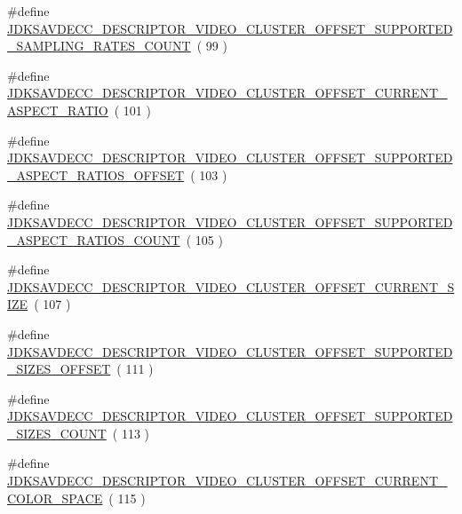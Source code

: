 \begin{DoxyCompactItemize}
\item 
\#define \hyperlink{group__descriptor__video__cluster_ga8cd45eb4da7e8460ffd3e04ffb6266a2}{J\+D\+K\+S\+A\+V\+D\+E\+C\+C\+\_\+\+D\+E\+S\+C\+R\+I\+P\+T\+O\+R\+\_\+\+V\+I\+D\+E\+O\+\_\+\+C\+L\+U\+S\+T\+E\+R\+\_\+\+O\+F\+F\+S\+E\+T\+\_\+\+S\+U\+P\+P\+O\+R\+T\+E\+D\+\_\+\+S\+A\+M\+P\+L\+I\+N\+G\+\_\+\+R\+A\+T\+E\+S\+\_\+\+C\+O\+U\+NT}~( 99 )
\item 
\#define \hyperlink{group__descriptor__video__cluster_gabffef4b51634347e0f912ad6b97ddb6a}{J\+D\+K\+S\+A\+V\+D\+E\+C\+C\+\_\+\+D\+E\+S\+C\+R\+I\+P\+T\+O\+R\+\_\+\+V\+I\+D\+E\+O\+\_\+\+C\+L\+U\+S\+T\+E\+R\+\_\+\+O\+F\+F\+S\+E\+T\+\_\+\+C\+U\+R\+R\+E\+N\+T\+\_\+\+A\+S\+P\+E\+C\+T\+\_\+\+R\+A\+T\+IO}~( 101 )
\item 
\#define \hyperlink{group__descriptor__video__cluster_ga5e964d79d640516ef264474d8079eb2f}{J\+D\+K\+S\+A\+V\+D\+E\+C\+C\+\_\+\+D\+E\+S\+C\+R\+I\+P\+T\+O\+R\+\_\+\+V\+I\+D\+E\+O\+\_\+\+C\+L\+U\+S\+T\+E\+R\+\_\+\+O\+F\+F\+S\+E\+T\+\_\+\+S\+U\+P\+P\+O\+R\+T\+E\+D\+\_\+\+A\+S\+P\+E\+C\+T\+\_\+\+R\+A\+T\+I\+O\+S\+\_\+\+O\+F\+F\+S\+ET}~( 103 )
\item 
\#define \hyperlink{group__descriptor__video__cluster_gaef518281ffcb8d69b609c5773d7057d5}{J\+D\+K\+S\+A\+V\+D\+E\+C\+C\+\_\+\+D\+E\+S\+C\+R\+I\+P\+T\+O\+R\+\_\+\+V\+I\+D\+E\+O\+\_\+\+C\+L\+U\+S\+T\+E\+R\+\_\+\+O\+F\+F\+S\+E\+T\+\_\+\+S\+U\+P\+P\+O\+R\+T\+E\+D\+\_\+\+A\+S\+P\+E\+C\+T\+\_\+\+R\+A\+T\+I\+O\+S\+\_\+\+C\+O\+U\+NT}~( 105 )
\item 
\#define \hyperlink{group__descriptor__video__cluster_ga3cd776c35ffd91d257e611da713d9182}{J\+D\+K\+S\+A\+V\+D\+E\+C\+C\+\_\+\+D\+E\+S\+C\+R\+I\+P\+T\+O\+R\+\_\+\+V\+I\+D\+E\+O\+\_\+\+C\+L\+U\+S\+T\+E\+R\+\_\+\+O\+F\+F\+S\+E\+T\+\_\+\+C\+U\+R\+R\+E\+N\+T\+\_\+\+S\+I\+ZE}~( 107 )
\item 
\#define \hyperlink{group__descriptor__video__cluster_gaf827cacae566819be909e5fd70bcd667}{J\+D\+K\+S\+A\+V\+D\+E\+C\+C\+\_\+\+D\+E\+S\+C\+R\+I\+P\+T\+O\+R\+\_\+\+V\+I\+D\+E\+O\+\_\+\+C\+L\+U\+S\+T\+E\+R\+\_\+\+O\+F\+F\+S\+E\+T\+\_\+\+S\+U\+P\+P\+O\+R\+T\+E\+D\+\_\+\+S\+I\+Z\+E\+S\+\_\+\+O\+F\+F\+S\+ET}~( 111 )
\item 
\#define \hyperlink{group__descriptor__video__cluster_ga9f3ce4affd203d18c8493f85841e7fdc}{J\+D\+K\+S\+A\+V\+D\+E\+C\+C\+\_\+\+D\+E\+S\+C\+R\+I\+P\+T\+O\+R\+\_\+\+V\+I\+D\+E\+O\+\_\+\+C\+L\+U\+S\+T\+E\+R\+\_\+\+O\+F\+F\+S\+E\+T\+\_\+\+S\+U\+P\+P\+O\+R\+T\+E\+D\+\_\+\+S\+I\+Z\+E\+S\+\_\+\+C\+O\+U\+NT}~( 113 )
\item 
\#define \hyperlink{group__descriptor__video__cluster_gad6cebb8e5bd3801185e7d80d417bf435}{J\+D\+K\+S\+A\+V\+D\+E\+C\+C\+\_\+\+D\+E\+S\+C\+R\+I\+P\+T\+O\+R\+\_\+\+V\+I\+D\+E\+O\+\_\+\+C\+L\+U\+S\+T\+E\+R\+\_\+\+O\+F\+F\+S\+E\+T\+\_\+\+C\+U\+R\+R\+E\+N\+T\+\_\+\+C\+O\+L\+O\+R\+\_\+\+S\+P\+A\+CE}~( 115 )

\end{DoxyCompactItemize}
